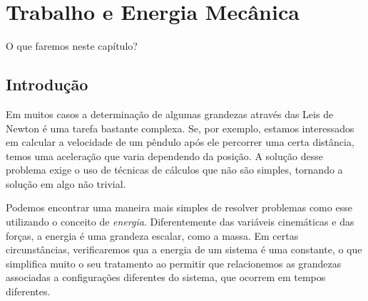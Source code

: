 \chapter{Trabalho e Energia Mecânica}
\label{Chap:Energia}





\begin{fullwidth}
{\it

O que faremos neste capítulo?

}
\end{fullwidth}

\section{Introdução} 

Em muitos casos a determinação de algumas grandezas através das Leis de Newton é uma tarefa bastante complexa. Se, por exemplo, estamos interessados em calcular a velocidade de um pêndulo após ele percorrer uma certa distância, temos uma aceleração que varia dependendo da posição. A solução desse problema exige o uso de técnicas de cálculos que não são simples, tornando a solução em algo não trivial.

Podemos encontrar uma maneira mais simples de resolver problemas como esse utilizando o conceito de \emph{energia}. Diferentemente das variáveis cinemáticas e das forças, a energia é uma grandeza escalar, como a massa. Em certas circunstâncias, verificaremos qua a energia de um sistema é uma constante, o que simplifica muito o seu tratamento ao permitir que relacionemos as grandezas associadas a configurações diferentes do sistema, que ocorrem em tempos diferentes.

